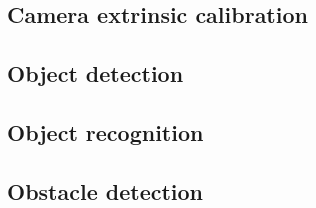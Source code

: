 \subsection{Camera extrinsic calibration}
\subsection{Object detection}
\subsection{Object recognition}
\subsection{Obstacle detection}
